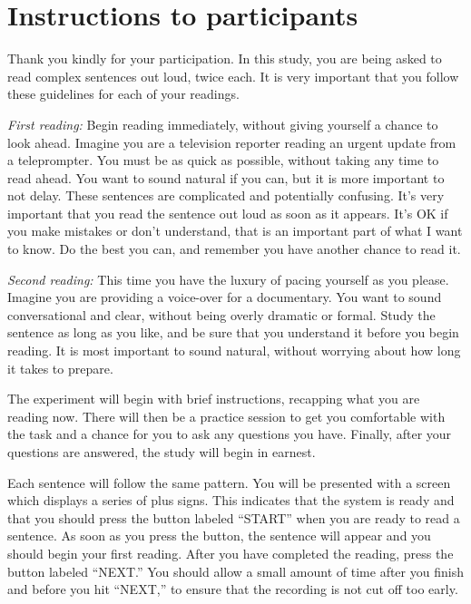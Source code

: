 \documentclass[11pt,oneside]{book}
\begin{document}
\newpage

\hypertarget{instr}{%
\chapter{Instructions to participants}\label{instr}}

Thank you kindly for your participation. In this study, you are being asked to read complex sentences out loud, twice each. It is very important that you follow these guidelines for each of your readings.

\emph{First reading:} Begin reading immediately, without giving yourself a chance to look ahead. Imagine you are a television reporter reading an urgent update from a teleprompter. You must be as quick as possible, without taking any time to read ahead. You want to sound natural if you can, but it is more important to not delay. These sentences are complicated and potentially confusing. It's very important that you read the sentence out loud as soon as it appears. It's OK if you make mistakes or don't understand, that is an important part of what I want to know. Do the best you can, and remember you have another chance to read it.

\emph{Second reading:} This time you have the luxury of pacing yourself as you please. Imagine you are providing a voice-over for a documentary. You want to sound conversational and clear, without being overly dramatic or formal. Study the sentence as long as you like, and be sure that you understand it before you begin reading. It is most important to sound natural, without worrying about how long it takes to prepare.

The experiment will begin with brief instructions, recapping what you are reading now. There will then be a practice session to get you comfortable with the task and a chance for you to ask any questions you have. Finally, after your questions are answered, the study will begin in earnest.

Each sentence will follow the same pattern. You will be presented with a screen which displays a series of plus signs. This indicates that the system is ready and that you should press the button labeled ``START'' when you are ready to read a sentence. As soon as you press the button, the sentence will appear and you should begin your first reading. After you have completed the reading, press the button labeled ``NEXT.'' You should allow a small amount of time after you finish and before you hit ``NEXT,'' to ensure that the recording is not cut off too early.
\end{document}
